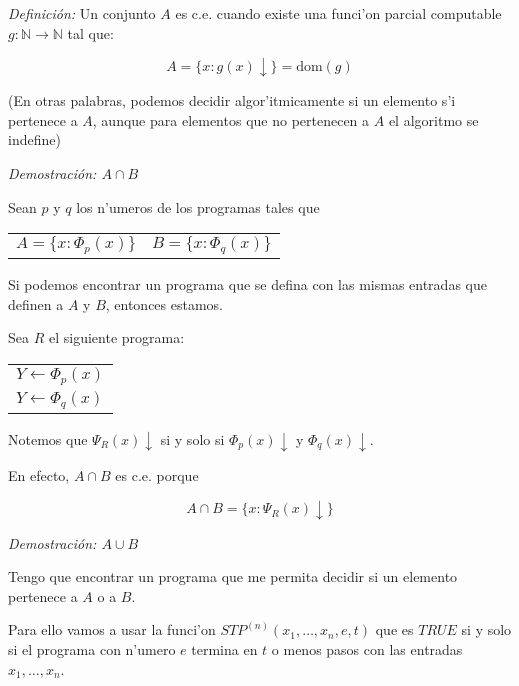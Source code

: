 \begin{questions}
\begin{solution}
  {\it Definici\'on:} Un conjunto $A$ es c.e. cuando existe una funci'on parcial computable $g: \mathbb{N} \rightarrow \mathbb{N}$ tal que: 

  \begin{equation*}
  A = \{ x : g(x) \downarrow \} = \text{dom}(g)
  \end{equation*}

  (En otras palabras, podemos decidir algor'itmicamente si un elemento s'i pertenece a $A$, aunque para elementos que no pertenecen a $A$ el algoritmo se indefine)

  {\it Demostraci\'on: $A \cap B$}

  Sean $p$ y $q$ los n'umeros de los programas tales que

  \begin{center}
  \begin{tabular}{ l r }
  \(\displaystyle A = \{ x : \Phi_p(x) \} \) & \(\displaystyle B = \{ x : \Phi_q(x) \} \) \\
  \end{tabular}
  \end{center}

  Si podemos encontrar un programa que se defina con las mismas entradas que definen a $A$ y $B$, entonces estamos. 

  Sea $R$ el siguiente programa: 

  \vspace{0.5cm}
  \begin{tabular}{l}
  $Y \leftarrow \Phi_p(x)$ \\ 
  $Y \leftarrow \Phi_q(x)$
  \end{tabular}
  \vspace{0.5cm}

  Notemos que $\Psi_R(x)\downarrow$ si y solo si $\Phi_p(x)\downarrow$ y $\Phi_q(x)\downarrow$. 

  En efecto, $A\cap B$ es c.e. porque

  \begin{equation*}
  A\cap B = \{ x : \Psi_R(x)\downarrow \}
  \end{equation*}

  {\it Demostraci\'on: $A\cup B$}

  Tengo que encontrar un programa que me permita decidir si un elemento pertenece a $A$ o a $B$. 

  Para ello vamos a usar la funci'on $STP^{(n)}(x_1, \dots, x_n, e, t)$ que es $TRUE$ si y solo si el programa con n'umero $e$ termina en $t$ o menos pasos con las entradas $x_1, \dots, x_n$. 


\end{solution}
\end{questions}
